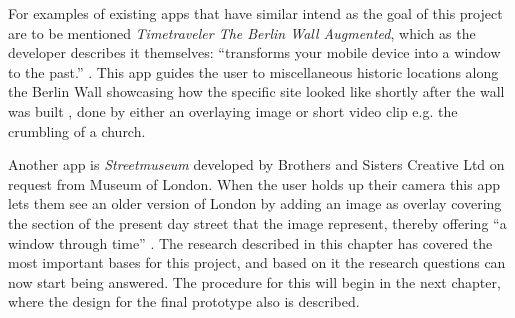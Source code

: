 For examples of existing apps that have similar intend as the goal of this project are to be mentioned \textit{Timetraveler The Berlin Wall Augmented}, which as the developer describes it themselves: “transforms your mobile device into a window to the past.” . This app guides the user to miscellaneous historic locations along the Berlin Wall showcasing how the specific site looked like shortly after the wall was built , done by either an overlaying image or short video clip e.g. the crumbling of a church. 

Another app is \textit{Streetmuseum} developed by Brothers and Sisters Creative Ltd on request from Museum of London. When the user holds up their camera this app lets them see an older version of London by adding an image as overlay covering the section of the present day street that the image represent, thereby offering “a window through time”  .
The research described in this chapter has covered the most important bases for this project, and based on it the research questions can now start being answered. The procedure for this will begin in the next chapter, where the design for the final prototype also is described. 


